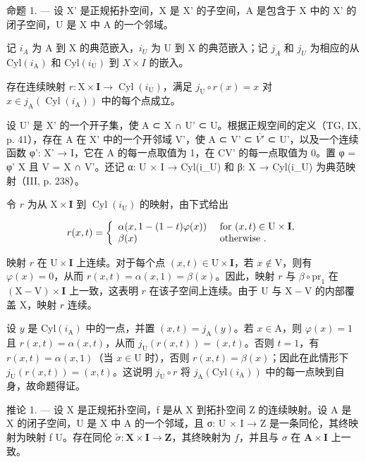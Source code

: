 命题 1. --- 设 X' 是正规拓扑空间，X 是 X' 的子空间，A 是包含于 X 中的 X' 的闭子空间，U 是 X 中 A 的一个邻域。

记 \(i_{A}\) 为 A 到 X 的典范嵌入，\(i_{U}\) 为 U 到 X 的典范嵌入；记 \(j_{A}\) 和 \(j_{U}\) 为相应的从 \(\mathrm{Cyl}(i_{\mathrm{A}})\) 和 \(\mathrm{Cyl}(i_{\mathrm{U}})\) 到 \(X \times I\) 的嵌入。

存在连续映射 \(r \colon \mathrm{X} \times \mathbf{I} \to \operatorname{Cyl}(i_{\mathrm{U}})\)，满足 \(j_{\mathrm{U}} \circ r(x) = x\) 对 \(x \in j_{\mathrm{A}}(\operatorname{Cyl}(i_{\mathrm{A}}))\) 中的每个点成立。

设 U' 是 X' 的一个开子集，使 A ⊂ X ∩ U' ⊂ U。根据正规空间的定义（TG, IX, p. 41），存在 A 在 X' 中的一个开邻域 V'，使 A ⊂ V' ⊂ \(\overline{V'}\) ⊂ U'，以及一个连续函数 φ': X' → I，它在 A 的每一点取值为 1，在 CV' 的每一点取值为 0。置 φ = φ' \textbar{} X 且 V = X ∩ V'。还记 α: U × I → Cyl(i\_U) 和 β: X → Cyl(i\_U) 为典范映射（III, p. 238）。

令 \(r\) 为从 \(\mathrm{X} \times \mathbf{I}\) 到 \(\operatorname{Cyl}(i_{\mathrm{U}})\) 的映射，由下式给出

\[
r (x, t) = \left\{ \begin{array}{l l} \alpha (x, 1 - (1 - t) \varphi (x)) & \text { for } (x, t) \in \mathrm{U} \times \mathbf {I}, \\ \beta (x) & \text { otherwise }. \end{array} \right.
\]

映射 \(r\) 在 \(\mathrm{U} \times \mathbf{I}\) 上连续。对于每个点 \((x, t) \in \mathrm{U} \times \mathbf{I}\)，若 \(x \notin \mathrm{V}\)，则有 \(\varphi(x) = 0\)，从而 \(r(x, t) = \alpha(x, 1) = \beta(x)\)。因此，映射 \(r\) 与 \(\beta \circ \mathrm{pr}_1\) 在 \((\mathrm{X} - \mathrm{V}) \times \mathbf{I}\) 上一致，这表明 \(r\) 在该子空间上连续。由于 U 与 \(\mathrm{X} - \mathrm{V}\) 的内部覆盖 X，映射 \(r\) 连续。

设 \(y\) 是 \(\mathrm{Cyl}(i_{\mathrm{A}})\) 中的一点，并置 \((x,t) = j_{\mathrm{A}}(y)\)。若 \(x \in \mathrm{A}\)，则 \(\varphi(x) = 1\) 且 \(r(x,t) = \alpha(x,t)\)，从而 \(j_{\mathrm{U}}(r(x,t)) = (x,t)\)。否则 \(t = 1\)，有 \(r(x,t) = \alpha(x,1)\)（当 \(x \in \mathrm{U}\) 时），否则 \(r(x,t) = \beta(x)\)；因此在此情形下 \(j_{\mathrm{U}}(r(x,t)) = (x,t)\)。这说明 \(j_{\mathrm{U}} \circ r\) 将 \(j_{\mathrm{A}}(\mathrm{Cyl}(i_{\mathrm{A}}))\) 中的每一点映到自身，故命题得证。

推论 1. --- 设 X 是正规拓扑空间，f 是从 X 到拓扑空间 Z 的连续映射。设 A 是 X 的闭子空间，U 是 X 中 A 的一个邻域，且 σ: U × I → Z 是一条同伦，其终映射为映射 f \textbar{} U。存在同伦 \(\widetilde{\sigma}\colon\mathbf{X}\times\mathbf{I}\to\mathbf{Z}\)，其终映射为 \(f\)，并且与 \(\sigma\) 在 \(\mathbf{A}\times\mathbf{I}\) 上一致。

